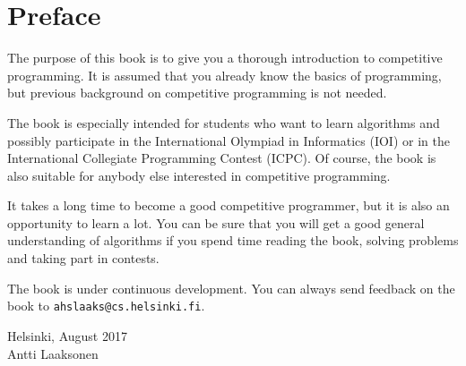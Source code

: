\chapter*{Preface}

The purpose of this book is to give you
a thorough introduction to competitive programming.
It is assumed that you already
know the basics of programming, but previous
background on competitive programming is not needed.

The book is especially intended for
students who want to learn algorithms and
possibly participate in
the International Olympiad in Informatics (IOI) or
in the International Collegiate Programming Contest (ICPC).
Of course, the book is also suitable for 
anybody else interested in competitive programming.

It takes a long time to become a good competitive
programmer, but it is also an opportunity to learn a lot.
You can be sure that you will get
a good general understanding of algorithms
if you spend time reading the book,
solving problems and taking part in contests.

The book is under continuous development.
You can always send feedback on the book to
\texttt{ahslaaks@cs.helsinki.fi}.

\begin{flushright}
Helsinki, August 2017 \\
Antti Laaksonen
\end{flushright}
